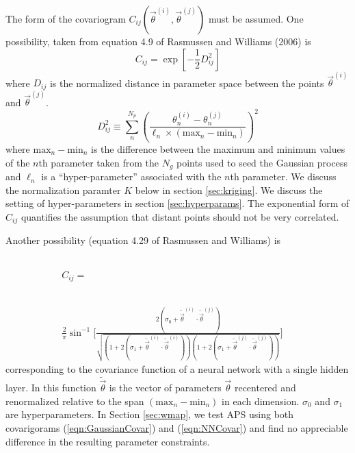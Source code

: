 \documentclass[useAMS,usenatbib]{aastex}
\begin{document}
The form of the covariogram
$C_{ij}(\vec{\theta}^{(i)},\vec{\theta}^{(j)})$ must be
assumed.  One possibility, 
taken from equation 4.9 of Rasmussen and Williams (2006) is
\begin{equation}
\label{eqn:GaussianCovar}
C_{ij}=\exp\left[-\frac{1}{2}D^2_{ij}\right]
\end{equation}
where $D_{ij}$ is the normalized distance in parameter space between the points 
$\vec{\theta}^{(i)}$
and $\vec{\theta}^{(j)}$.
\begin{equation}
D^2_{ij}\equiv\sum_n^{N_p}
\left(\frac{\theta^{(i)}_n-\theta^{(j)}_n}{\ell_n\times(\text{max}_n-\text{min}_n)}\right)^2
\end{equation}
where $\text{max}_n-\text{min}_n$ is the difference between the maximum and minimum values of
the $n$th parameter taken from the $N_g$ points used to seed the Gaussian process and $\ell_n$
is a ``hyper-parameter'' associated with the $n$th parameter.  We discuss the normalization
paramter $K$ below in section \ref{sec:kriging}.  We discuss the setting of
hyper-parameters in section \ref{sec:hyperparams}.
The exponential form of $C_{ij}$ quantifies the assumption 
that distant points should
not be very correlated.

Another possibility (equation 4.29 of Rasmussen and Williams) is
\begin{eqnarray}
C_{ij}=\phantom{\sin
\bigg[\frac{2(\sigma_0+\tilde{\vec{\theta}}^{(i)}\cdot\tilde{\vec{\theta}}^{(j)})}
{\sqrt{(1+2(\sigma_1+\tilde{\vec{\theta}}^{(i)}\cdot\tilde{\vec{\theta}}^{(i)}))
(1+2(\sigma_1+\tilde{\vec{\theta}}^{(j)}\cdot\tilde{\vec{\theta}}^{(j)}))}}\bigg]}
\label{eqn:NNCovar}\\
\frac{2}{\pi}\sin^{-1}
\bigg[\frac{2(\sigma_0+\tilde{\vec{\theta}}^{(i)}\cdot\tilde{\vec{\theta}}^{(j)})}
{\sqrt{(1+2(\sigma_1+\tilde{\vec{\theta}}^{(i)}\cdot\tilde{\vec{\theta}}^{(i)}))
(1+2(\sigma_1+\tilde{\vec{\theta}}^{(j)}\cdot\tilde{\vec{\theta}}^{(j)}))}}\bigg]
\nonumber
\end{eqnarray}
corresponding to the covariance function of a neural network with a single
hidden layer.  In this function $\tilde{\vec{\theta}}$ is the vector of
parameters $\vec{\theta}$ recentered and renormalized relative to the span
$(\text{max}_n-\text{min}_n)$ in each dimension.  $\sigma_0$ and $\sigma_1$
are hyperparameters.  
In Section \ref{sec:wmap}, we test APS using both covarigorams (\ref{eqn:GaussianCovar})
and (\ref{eqn:NNCovar}) and find no appreciable difference
in the resulting parameter constraints.
\end{document}
